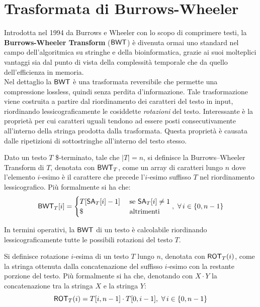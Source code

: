 \section{Trasformata di Burrows-Wheeler}
\label{secbwt}
Introdotta nel 1994 da Burrows e Wheeler con lo scopo di comprimere testi, la
\textbf{Burrows-Wheeler Transform} ($\mbox{\rm {\sf BWT}}$) \cite{bwt} è divenuta ormai uno
standard nel 
campo dell'algoritmica su stringhe e della bioinformatica,
grazie ai suoi molteplici vantaggi sia dal punto di vista della complessità
temporale che da quello dell'efficienza in memoria.\\
Nel dettaglio la $\mbox{\rm {\sf BWT}}$ è una trasformata reversibile che
permette una compressione lossless, quindi senza perdita
d'informazione. Tale trasformazione viene costruita a partire dal riordinamento
dei caratteri del testo in input, riordinando lessicograficamente le cosiddette
\textit{rotazioni} del testo. Interessante è la proprietà per cui caratteri
uguali tendono ad essere posti consecutivamente all'interno della stringa
prodotta dalla trasformata. Questa proprietà è causata dalle ripetizioni di
sottostringhe all'interno del testo stesso.
\begin{definizione}
  Dato un testo $T$ \$-terminato, tale che $|T|=n$, si definisce la
  Burrows--Wheeler Transform di $T$, denotata con
  $\mbox{\rm {\sf BWT}}_T$, come un array di caratteri lungo $n$ dove l'elemento $i$-esimo è il
  carattere che precede l'$i$-esimo suffisso $T$ nel riordinamento
  lessicografico. Più formalmente si ha che:
  \begin{equation}
    \label{eq:bwt1}
    \mbox{\rm {\sf BWT}}_T[i]=
    \begin{cases}
      T[\mbox{\rm {\sf SA}}_T[i]-1]&\mbox{ se } \mbox{\rm {\sf SA}}_T[i]\neq 1\\
      \$&\mbox{ altrimenti}
    \end{cases},\,\, \forall\, i\in\{0,n-1\}
  \end{equation}
\end{definizione}
In termini operativi, la $\mbox{\rm {\sf BWT}}$ di un testo è calcolabile riordinando
lessicograficamente tutte le possibili rotazioni del testo $T$.
\begin{definizione}
  Si definisce rotazione $i$-esima di
  un testo $T$ lungo $n$, denotata con $\mbox{\rm {\sf ROT}}_T(i)$, come la stringa ottenuta
  dalla concatenazione 
  del suffisso $i$-esimo con la restante porzione del testo. Più formalmente si
  ha che, denotando con $X\cdot Y$ la concatenazione tra
  la stringa $X$ e la stringa $Y$:
  \begin{equation}
    \label{eq:bwt2}
    \mbox{\rm {\sf ROT}}_T(i)=T[i,n-1]\cdot T[0,i-1],\,\,\forall\, i\in\{0,n-1\}
  \end{equation}
\end{definizione}
